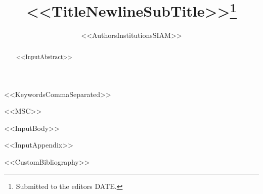 \documentclass[%
review,
onefignum,
onetabnum,
<<DocumentClassOptions>>]{siamonline220329}
\title{<<TitleNewlineSubTitle>>\thanks{Submitted to the editors DATE.\funding{<<Funding>>}}}
\author{%
<<AuthorsInstitutionsSIAM>>
}
\begin{document}
\maketitle

\begin{abstract}
<<InputAbstract>>
\end{abstract}

\begin{keywords}
<<KeywordsCommaSeparated>>
\end{keywords}

\begin{MSCcodes}
<<MSC>>
\end{MSCcodes}

<<InputBody>>

\appendix
<<InputAppendix>>


<<CustomBibliography>>
\end{document}
